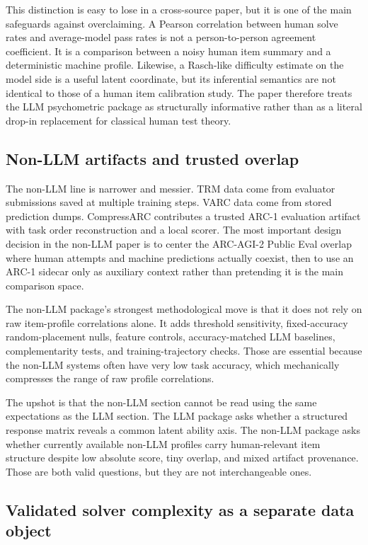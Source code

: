 This distinction is easy to lose in a cross-source paper, but it is one of the main safeguards against overclaiming. A Pearson correlation between human solve rates and average-model pass rates is not a person-to-person agreement coefficient. It is a comparison between a noisy human item summary and a deterministic machine profile. Likewise, a Rasch-like difficulty estimate on the model side is a useful latent coordinate, but its inferential semantics are not identical to those of a human item calibration study. The paper therefore treats the LLM psychometric package as structurally informative rather than as a literal drop-in replacement for classical human test theory.

\subsection{Non-LLM artifacts and trusted overlap}

The non-LLM line is narrower and messier. TRM data come from evaluator submissions saved at multiple training steps. VARC data come from stored prediction dumps. CompressARC contributes a trusted ARC-1 evaluation artifact with task order reconstruction and a local scorer. The most important design decision in the non-LLM paper is to center the ARC-AGI-2 Public Eval overlap where human attempts and machine predictions actually coexist, then to use an ARC-1 sidecar only as auxiliary context rather than pretending it is the main comparison space.

The non-LLM package's strongest methodological move is that it does not rely on raw item-profile correlations alone. It adds threshold sensitivity, fixed-accuracy random-placement nulls, feature controls, accuracy-matched LLM baselines, complementarity tests, and training-trajectory checks. Those are essential because the non-LLM systems often have very low task accuracy, which mechanically compresses the range of raw profile correlations.

The upshot is that the non-LLM section cannot be read using the same expectations as the LLM section. The LLM package asks whether a structured response matrix reveals a common latent ability axis. The non-LLM package asks whether currently available non-LLM profiles carry human-relevant item structure despite low absolute score, tiny overlap, and mixed artifact provenance. Those are both valid questions, but they are not interchangeable ones.

\subsection{Validated solver complexity as a separate data object}

